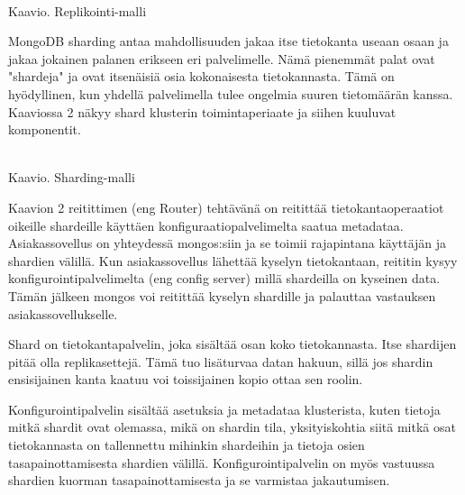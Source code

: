 \\
Kaavio\getChartCount{}. Replikointi-malli 
\medskip



MongoDB sharding antaa mahdollisuuden jakaa itse tietokanta useaan osaan ja jakaa jokainen palanen erikseen eri palvelimelle.
Nämä pienemmät palat ovat "shardeja"{} ja ovat itsenäisiä osia kokonaisesta tietokannasta.
Tämä on hyödyllinen, kun yhdellä palvelimella tulee ongelmia suuren tietomäärän kanssa.
Kaaviossa 2 näkyy shard klusterin toimintaperiaate ja siihen kuuluvat komponentit. 
\medskip



\bigskip
\\
Kaavio\getChartCount{}. Sharding-malli 
\medskip



Kaavion 2 reitittimen (eng Router) tehtävänä on reitittää tietokantaoperaatiot oikeille shardeille käyttäen konfiguraatiopalvelimelta saatua metadataa.
Asiakassovellus on yhteydessä mongos:siin ja se toimii rajapintana käyttäjän ja shardien välillä. 
Kun asiakassovellus lähettää kyselyn tietokantaan, reititin kysyy konfigurointipalvelimelta (eng config server) millä shardeilla on kyseinen data. 
Tämän jälkeen mongos voi reitittää kyselyn shardille ja palauttaa vastauksen asiakassovellukselle.
\medskip

Shard on tietokantapalvelin, joka sisältää osan koko tietokannasta.
Itse shardijen pitää olla replikasettejä.
Tämä tuo lisäturvaa datan hakuun, sillä jos shardin ensisijainen kanta kaatuu voi toissijainen kopio ottaa sen roolin. 
\medskip



Konfigurointipalvelin sisältää asetuksia ja metadataa klusterista,
kuten tietoja mitkä shardit ovat olemassa, mikä on shardin tila,
yksityiskohtia siitä mitkä osat tietokannasta on tallennettu mihinkin shardeihin
ja tietoja osien tasapainottamisesta shardien välillä.
Konfigurointipalvelin on myös vastuussa shardien kuorman tasapainottamisesta ja se varmistaa jakautumisen.









